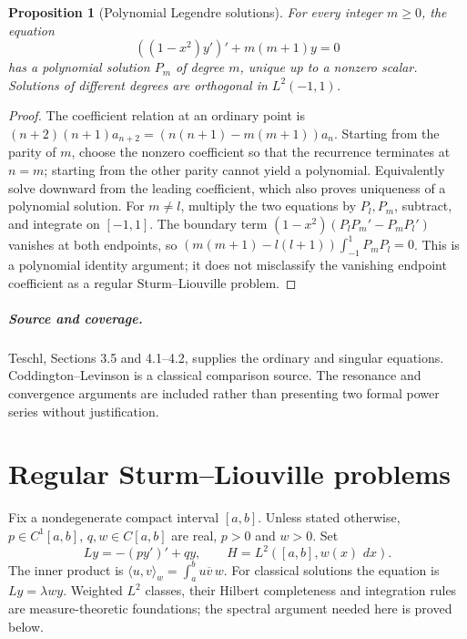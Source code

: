 \documentclass[11pt,oneside]{book}
\newtheorem{proposition}[theorem]{Proposition}
\theoremstyle{definition}
\theoremstyle{remark}\newtheorem{remark}[theorem]{Remark}
\newcommand{\dd}{\,d}\newcommand{\id}{\operatorname{id}}
\begin{document}
\begin{proposition}[Polynomial Legendre solutions]\label{d13:09:legendre}
For every integer \(m\ge0\), the equation
\[
 ((1-x^2)y')'+m(m+1)y=0
\]
has a polynomial solution \(P_m\) of degree \(m\), unique up to a nonzero
scalar. Solutions of different degrees are orthogonal in \(L^2(-1,1)\).
\end{proposition}
\begin{proof}
The coefficient relation at an ordinary point is
\((n+2)(n+1)a_{n+2}=(n(n+1)-m(m+1))a_n\).
Starting from the parity of \(m\), choose the nonzero coefficient so that
the recurrence terminates at \(n=m\); starting from the other parity
cannot yield a polynomial. Equivalently solve downward from the leading
coefficient, which also proves uniqueness of a polynomial solution.
For \(m\ne l\), multiply the two equations by \(P_l,P_m\), subtract, and
integrate on \([-1,1]\). The boundary term
\((1-x^2)(P_lP_m'-P_mP_l')\) vanishes at both endpoints, so
\((m(m+1)-l(l+1))\int_{-1}^1P_mP_l=0\).
This is a polynomial identity argument; it does not misclassify the
vanishing endpoint coefficient as a regular Sturm--Liouville problem.
\end{proof}

\paragraph{Source and coverage.}
Teschl, Sections 3.5 and 4.1--4.2, supplies the ordinary and singular
equations. Coddington--Levinson is a classical comparison source.
The resonance and convergence arguments are included rather than
presenting two formal power series without justification.



\chapter{Regular Sturm--Liouville problems}\label{ch:d13-10}

Fix a nondegenerate compact interval \([a,b]\). Unless stated otherwise,
\(p\in C^1[a,b]\), \(q,w\in C[a,b]\) are real,
\(p>0\) and \(w>0\). Set
\[
 Ly=-(py')'+qy,\qquad H=L^2([a,b],w(x)\,\dd x).
\]
The inner product is \(\langle u,v\rangle_w=\int_a^bu\overline v\,w\).
For classical solutions the equation is \(Ly=\lambda wy\).
Weighted \(L^2\) classes, their Hilbert completeness and integration rules
are measure-theoretic foundations; the spectral argument needed here is
proved below.
\end{document}
